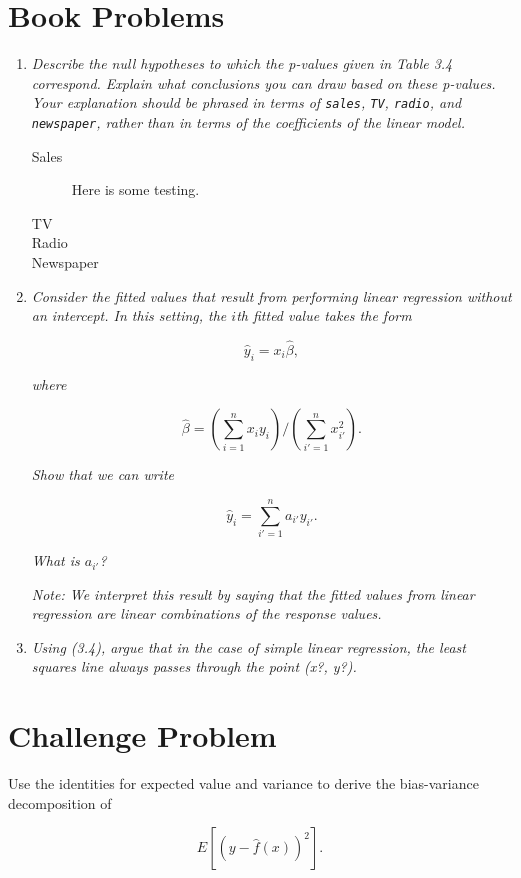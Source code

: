 \documentclass[11pt]{article}
\begin{document}
    
    
\bigskip

\section*{Book Problems}


\begin{enumerate}
	\item \textit{Describe the null hypotheses to which the p-values given in Table 3.4 correspond. Explain what conclusions you can draw based on these p-values. Your explanation should be phrased in terms of \texttt{sales}, \texttt{TV}, \texttt{radio}, and \texttt{newspaper}, rather than in terms of the coefficients of the linear model.}

    \begin{description}
        \item[Sales] Here is some testing.
        
        \item[TV]

        \item[Radio]

        \item[Newspaper]    
         
    \end{description}
	
  	\setcounter{enumi}{4}
	\item \textit{Consider the fitted values that result from performing linear regression without an intercept. In this setting, the $i$th fitted value takes the form}
	
	$$ \hat{y}_i = x_i\hat{\beta},$$
	
	\textit{where}
	
	$$ \hat{\beta} = \left(\sum_{i=1}^nx_iy_i\right) / \left(\sum_{i'=1}^nx_{i'}^2\right).$$
	
	
	\textit{Show that we can write}
	
	$$ \hat{y}_i = \sum_{i'=1}^na_{i'}y_{i'}.$$
	
	\textit{What is $a_{i'}$?}
	
	\textit{Note: We interpret this result by saying that the fitted values from linear regression are linear combinations of the response values.}
	
	\item \textit{Using (3.4), argue that in the case of simple linear regression, the
least squares line always passes through the point (x?, y?).
}
	
\end{enumerate}


\section*{Challenge Problem}
Use the identities for expected value and variance to derive the bias-variance decomposition of 

$$ E\left[ \left(y - \hat{f}(x) \right)^2 \right].$$
\end{document}
